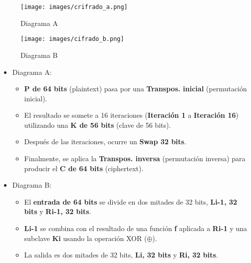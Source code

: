 \documentclass[a4paper,12pt]{article}
\begin{document}
\begin{figure}[H]
    \centering
    \begin{minipage}{0.45\textwidth}
        \centering
        \texttt{[image: images/crifrado\_a.png]}
        \caption{Diagrama A}
    \end{minipage}
    \hfill
    \begin{minipage}{0.45\textwidth}
        \centering
        \texttt{[image: images/cifrado\_b.png]}
        \caption{Diagrama B}
    \end{minipage}
\end{figure}

\begin{itemize}
    \item Diagrama A:
    \begin{itemize}
        \item \textbf{P de 64 bits} (plaintext) pasa por una \textbf{Transpos. inicial} (permutación inicial).
        \item El resultado se somete a 16 iteraciones (\textbf{Iteración 1} a \textbf{Iteración 16}) utilizando una \textbf{K de 56 bits} (clave de 56 bits).
        \item Después de las iteraciones, ocurre un \textbf{Swap 32 bits}.
        \item Finalmente, se aplica la \textbf{Transpos. inversa} (permutación inversa) para producir el \textbf{C de 64 bits} (ciphertext).
    \end{itemize}
    \item Diagrama B:
    \begin{itemize}
        \item El \textbf{entrada de 64 bits} se divide en dos mitades de 32 bits, \textbf{Li-1, 32 bits} y \textbf{Ri-1, 32 bits}.
        \item \textbf{Li-1} se combina con el resultado de una función \textbf{f} aplicada a \textbf{Ri-1} y una subclave \textbf{Ki} usando la operación XOR (\(\oplus\)).
        \item La salida es dos mitades de 32 bits, \textbf{Li, 32 bits} y \textbf{Ri, 32 bits}.
    \end{itemize}        
\end{itemize}
\end{document}
